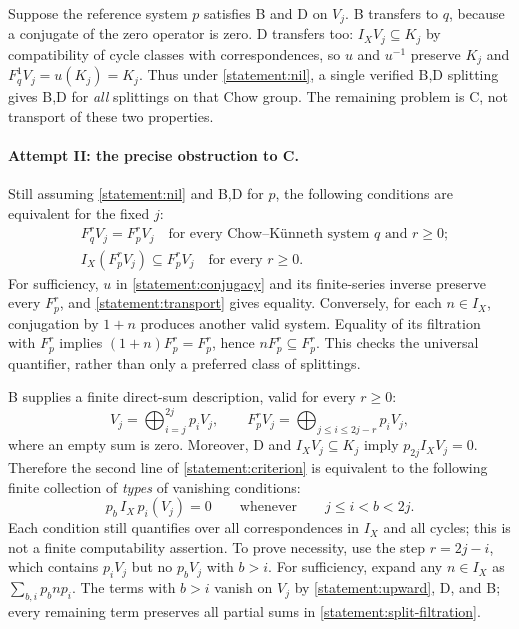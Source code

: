 \documentclass[11pt]{article}
\begin{document}
Suppose the reference system $p$ satisfies B and D on $V_j$.  B transfers to
$q$, because a conjugate of the zero operator is zero.  D transfers too:
$I_X V_j\subseteq K_j$ by compatibility of cycle classes with correspondences,
so $u$ and $u^{-1}$ preserve $K_j$ and
$F_q^1V_j=u(K_j)=K_j$.  Thus under \eqref{statement:nil}, a single verified B,D
splitting gives B,D for \emph{all} splittings on that Chow group.  The
remaining problem is C, not transport of these two properties.

\paragraph{Attempt II: the precise obstruction to C.}
Still assuming \eqref{statement:nil} and B,D for $p$, the following conditions are
equivalent for the fixed $j$:
\begin{equation}\label{statement:criterion}
 \begin{aligned}
 &F_q^r V_j=F_p^r V_j\quad\text{for every Chow--K\"unneth system $q$ and $r\geq0$};\\
 &I_X(F_p^r V_j)\subseteq F_p^r V_j\quad\text{for every $r\geq0$}.
 \end{aligned}
\end{equation}
For sufficiency, $u$ in \eqref{statement:conjugacy} and its finite-series inverse
preserve every $F_p^r$, and \eqref{statement:transport} gives equality.  Conversely,
for each $n\in I_X$, conjugation by $1+n$ produces another valid system.
Equality of its filtration with $F_p^r$ implies
$(1+n)F_p^r=F_p^r$, hence $nF_p^r\subseteq F_p^r$.  This checks the universal
quantifier, rather than only a preferred class of splittings.

B supplies a finite direct-sum description, valid for every $r\geq0$:
\begin{equation}\label{statement:split-filtration}
 V_j=\bigoplus_{i=j}^{2j}p_iV_j,\qquad
 F_p^rV_j=\bigoplus_{j\leq i\leq 2j-r}p_iV_j,
\end{equation}
where an empty sum is zero.  Moreover, D and $I_XV_j\subseteq K_j$ imply
$p_{2j}I_XV_j=0$.  Therefore the second line of
\eqref{statement:criterion} is equivalent to the following finite collection of
\emph{types} of vanishing conditions:
\begin{equation}\label{statement:upward}
 p_b\,I_X\,p_i(V_j)=0
 \qquad\text{whenever}\qquad j\leq i<b<2j.
\end{equation}
Each condition still quantifies over all correspondences in $I_X$ and all
cycles; this is not a finite computability assertion.
To prove necessity, use the step $r=2j-i$, which contains $p_iV_j$ but no
$p_bV_j$ with $b>i$.  For sufficiency, expand any $n\in I_X$ as
$\sum_{b,i}p_b n p_i$.  The terms with $b>i$ vanish on $V_j$ by
\eqref{statement:upward}, D, and B; every remaining term preserves all partial sums
in \eqref{statement:split-filtration}.
\end{document}
